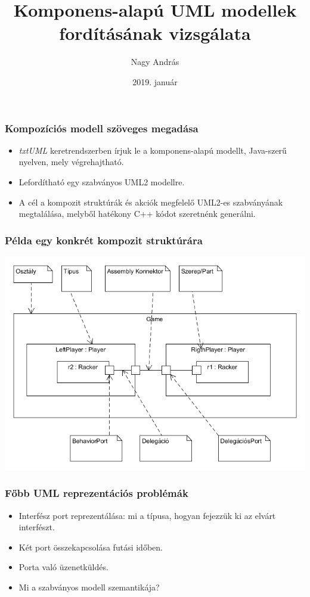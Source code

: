 \documentclass[11pt]{beamer}
\author{Nagy András}
\title{Komponens-alapú UML modellek fordításának vizsgálata}
\date{2019. január}
\begin{document}
\begin{frame}
\titlepage
\end{frame}

\begin{frame}[fragile]
	\frametitle{Kompozíciós modell szöveges megadása}
	
	\begin{itemize}
		\item \textit{txtUML} keretrendszerben írjuk le a komponens-alapú modellt, Java-szerű nyelven, mely végrehajtható.
		\item Lefordítható egy szabványos UML2 modellre.
		\item A cél a kompozit struktúrák és akciók megfelelő UML2-es szabványának megtalálása, melyből hatékony C++ kódot szeretnénk generálni.
	\end{itemize}
	
\end{frame}


\begin{frame}[fragile]
	\frametitle{Példa egy konkrét kompozit struktúrára}	
	\includegraphics[scale=0.4]{vedes_demo.png}	
	
\end{frame}

\begin{frame}[fragile]	
	\frametitle{Főbb UML reprezentációs problémák}	
	\begin{itemize}
	\item Interfész port reprezentálása: mi a típusa, hogyan fejezzük ki az elvárt interfészt.
	\item Két port összekapcsolása futási időben.
	\item Porta való üzenetküldés.
	\item Mi a szabványos modell szemantikája?
	\end{itemize}
	
\end{frame}
\end{document}
